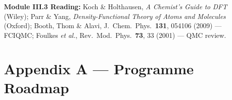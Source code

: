 \documentclass[11pt,a4paper]{article}
\begin{document}
\begin{tcolorbox}[highlightbox]
\textbf{Module III.3 Reading:} Koch \& Holthausen, \textit{A Chemist's Guide to DFT} (Wiley); Parr \& Yang, \textit{Density-Functional Theory of Atoms and Molecules} (Oxford); Booth, Thom \& Alavi, J.\ Chem.\ Phys.\ \textbf{131}, 054106 (2009) --- FCIQMC; Foulkes \textit{et al.}, Rev.\ Mod.\ Phys.\ \textbf{73}, 33 (2001) --- QMC review.
\end{tcolorbox}

\newpage
\section*{Appendix A --- Programme Roadmap}
\end{document}
